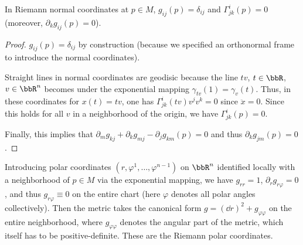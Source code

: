 \begin{prop}
    In Riemann normal coordinates at $p\in M$, $g_{ij}(p)=\delta_{ij}$ and $\Gamma^i_{jk}(p)=0$ (moreover, $\partial_k g_{ij}(p)=0$).
\end{prop}
\begin{proof}
    $g_{ij}(p)=\delta_{ij}$ by construction (because we specified an orthonormal frame to introduce the normal coordinates).
    
    Straight lines in normal coordinates are geodisic because the line $tv$, $t\in\bbR $, $v\in\bbR^n$ becomes under the exponential mapping $\gamma_{tv}(1)=\gamma_v(t)$. Thus, in these coordinates for $x(t)=tv$, one has $\Gamma^i_{jk}(tv)v^jv^k=0$ since $\ddot x=0$. Since this holds for all $v$ in a neighborhood of the origin, we have $\Gamma^i_{jk}(p)=0$. 
    
    Finally, this implies that $\partial_m g_{kj}+\partial_k g_{mj}-\partial_j g_{km}(p)=0$ and thus $\partial_k g_{jm}(p)=0$.
\end{proof}

\begin{defn}
    Introducing polar coordinates $(r,\varphi^1,\ldots,\varphi^{n-1})$ on $\bbR^n$ identified locally with a neighborhood of $p\in M$ via the exponential mapping, we have $g_{rr}=1$, $\partial_r g_{r\varphi}=0$, and thus $g_{r\varphi}\equiv 0$ on the entire chart (here $\varphi$ denotes all polar angles collectively). Then the metric takes the canonical form $g=(\dd r)^2+g_{\varphi\varphi}$ on the entire neighborhood, where $g_{\varphi\varphi}$ denotes the angular part of the metric, which itself has to be positive-definite. These are the Riemann polar coordinates.
\end{defn}

